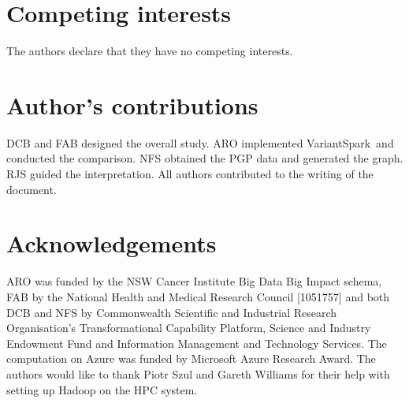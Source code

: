 \documentclass{bmcart}
\newcommand{\variantSpark}{{\sc VariantSpark}}
\begin{document}
\begin{backmatter}

\section*{Competing interests}
  The authors declare that they have no competing interests.

\section*{Author's contributions}
    DCB and FAB designed the overall study. ARO implemented \variantSpark\ and conducted the comparison. NFS obtained the PGP data and generated the graph. RJS guided the interpretation. 
    All authors contributed to the writing of the document. 

\section*{Acknowledgements}
  ARO was funded by the NSW Cancer Institute Big Data Big Impact schema, FAB by the National Health and Medical Research Council [1051757] and both DCB and NFS by Commonwealth Scientific and Industrial Research Organisation's Transformational Capability Platform, Science and Industry Endowment Fund and Information Management and Technology Services. The computation on Azure was funded by Microsoft Azure Research Award. 
The authors would like to thank Piotr Szul and Gareth Williams for their help with setting up Hadoop on the HPC system.




\end{backmatter}
\end{document}
